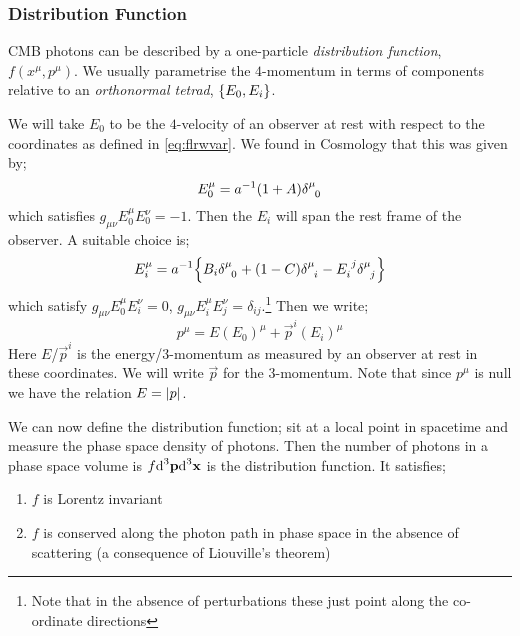 \subsubsection{Distribution Function}
CMB photons can be described by a one-particle \emph{distribution function}, $f(x^{\mu}, p^{\mu})$. We usually parametrise the $4$-momentum in terms of components relative to an \emph{orthonormal tetrad}, $\set{E_0, E_i}$.
\begin{examplebox}
We will take $E_0$ to be the $4$-velocity of an observer at rest with respect to the coordinates as defined in \eqref{eq:flrwvar}. We found in Cosmology that this was given by;
\begin{equation}
E_{0}^{\mu} = a^{-1}(1 + A)\delta\indices{^{\mu}_{0}}
\end{equation}
which satisfies $g_{\mu\nu}E_0^{\mu}E_0^{\nu} = -1$. Then the $E_i$ will span the rest frame of the observer. A suitable choice is;
\begin{equation}
E_i^{\mu} = a^{-1}\set{B_i \delta\indices{^{\mu}_{0}} + (1-C)\delta\indices{^{\mu}_{i}} - E\indices{_{i}^{j}}\delta\indices{^{\mu}_{j}}}
\end{equation}
which satisfy $g_{\mu\nu}E_0^{\mu}E_i^{\nu} = 0$, $g_{\mu\nu}E_i^{\mu}E_j^{\nu} = \delta_{ij}$.\footnote{Note that in the absence of perturbations these just point along the co-ordinate directions} Then we write;
\begin{equation}
p^{\mu} = E(E_0)^{\mu} + \vec{p}^i(E_i)^{\mu}
\end{equation}
Here $E$/$\vec p^{i}$ is the energy/$3$-momentum as measured by an observer at rest in these coordinates. We will write $\vec p$ for the $3$-momentum. Note that since $p^{\mu}$ is null we have the relation $E = \abs{p}$.
\end{examplebox}
We can now define the distribution function; sit at a local point in spacetime and measure the phase space density of photons. Then the number of photons in a phase space volume is $f \text{d}^3 \mathbf p \text{d}^3 \mathbf x$ is the distribution function. It satisfies;
\begin{enumerate}
\item $f$ is Lorentz invariant
\item $f$ is conserved along the photon path in phase space in the absence of scattering (a consequence of Liouville's theorem)
\end{enumerate}
